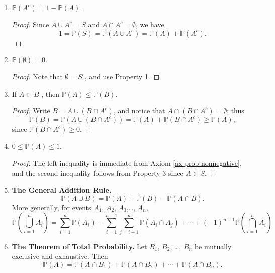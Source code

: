 \begin{enumerate}
\item \label{enu-prop-prob-complement} \(\mathbb{P}(A^{c})=1-\mathbb{P}(A)\).
\begin{proof}
Since \(A\cup A^{c}=S\) and \(A\cap A^{c}=\emptyset\), we have
\[
   1=\mathbb{P}(S)=\mathbb{P}(A\cup A^{c})=\mathbb{P}(A)+\mathbb{P}(A^{c}).
   \]
\end{proof}
\item \(\mathbb{P}(\emptyset)=0\).
\begin{proof}
Note that \(\emptyset=S^{c}\), and use Property 1.
\end{proof}
\item If \(A\subset B\) , then \(\mathbb{P}(A)\leq\mathbb{P}(B)\).
\begin{proof}
Write \(B=A\cup\left(B\cap A^{c}\right)\), and notice that \(A\cap\left(B\cap A^{c}\right)=\emptyset\); thus
\[
   \mathbb{P}(B)=\mathbb{P}(A\cup\left(B\cap A^{c}\right))=\mathbb{P}(A)+\mathbb{P}\left(B\cap A^{c}\right)\geq\mathbb{P}(A),
   \]
since \(\mathbb{P}\left(B\cap A^{c}\right)\ge0\). 
\end{proof}
\item \(0\leq\mathbb{P}(A)\leq1\).
\begin{proof}
The left inequality is immediate from Axiom \ref{ax-prob-nonnegative}, and the second inequality follows from Property 3 since \(A\subset S\).
\end{proof}

\item \textbf{The General Addition Rule.}
\begin{equation}
\label{eq-general-addition-rule-1}
\mathbb{P}(A\cup B)=\mathbb{P}(A)+\mathbb{P}(B)-\mathbb{P}(A\cap B).
\end{equation}
More generally, for events \(A_{1}\), \(A_{2}\), \(A_{3}\),\ldots{}, \(A_{n}\),
\begin{equation}
\mathbb{P}\left(\bigcup_{i=1}^{n}A_{i}\right)=\sum_{i=1}^{n}\mathbb{P}(A_{i})-\sum_{i=1}^{n-1}\sum_{j=i+1}^{n}\mathbb{P}(A_{i}\cap A_{j})+\cdots+(-1)^{n-1}\mathbb{P}\left(\bigcap_{i=1}^{n}A_{i}\right)
\end{equation}
\item \textbf{The Theorem of Total Probability.} Let \(B_{1}\), \(B_{2}\), \ldots{},
\(B_{n}\) be mutually exclusive and exhaustive. Then
\begin{equation}
\label{eq-theorem-total-probability}
\mathbb{P}(A)=\mathbb{P}(A\cap B_{1})+\mathbb{P}(A\cap B_{2})+\cdots+\mathbb{P}(A\cap B_{n}).
\end{equation}
\end{enumerate}

